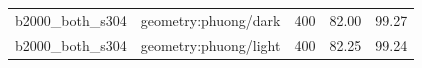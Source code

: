 \begin{longtable}{l>{\raggedright\arraybackslash}p{.42\linewidth}rrr}
b2000\_\allowbreak{}both\_\allowbreak{}s304 & %
geometry:phuong/dark & %
400 & %
82.00 & %
99.27 \\ %

b2000\_\allowbreak{}both\_\allowbreak{}s304 & %
geometry:phuong/light & %
400 & %
82.25 & %
99.24 \\ %


\end{longtable}
